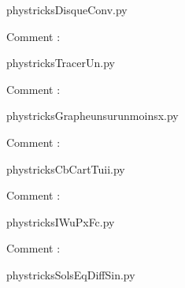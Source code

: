    \newcommand{\CaptionFigDisqueConv}{<+Type your caption here+>}
    \begin{center}
        
    \end{center}
    phystricksDisqueConv.py

    Comment : 

    \clearpage
    


    \newcommand{\CaptionFigTracerUn}{<+Type your caption here+>}
    \begin{center}
        
    \end{center}
    phystricksTracerUn.py

    Comment : 

    \clearpage
    


    \newcommand{\CaptionFigGrapheunsurunmoinsx}{<+Type your caption here+>}
    \begin{center}
        
    \end{center}
    phystricksGrapheunsurunmoinsx.py

    Comment : 

    \clearpage
    


    \newcommand{\CaptionFigCbCartTuii}{<+Type your caption here+>}
    \begin{center}
        
    \end{center}
    phystricksCbCartTuii.py

    Comment : 

    \clearpage
    


    \newcommand{\CaptionFigIWuPxFc}{<+Type your caption here+>}
    \begin{center}
        
    \end{center}
    phystricksIWuPxFc.py

    Comment : 

    \clearpage
    


    \newcommand{\CaptionFigSolsEqDiffSin}{<+Type your caption here+>}
    \begin{center}
        
    \end{center}
    phystricksSolsEqDiffSin.py

